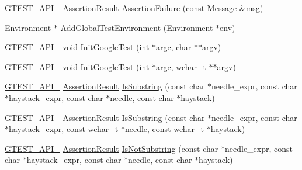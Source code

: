 \begin{DoxyCompactItemize}
\item 
\mbox{\hyperlink{gtest-port_8h_aa73be6f0ba4a7456180a94904ce17790}{G\+T\+E\+S\+T\+\_\+\+A\+P\+I\+\_\+}} \mbox{\hyperlink{classtesting_1_1_assertion_result}{Assertion\+Result}} \mbox{\hyperlink{namespacetesting_aed37b5c1db949665e4022cb4740d86c2}{Assertion\+Failure}} (const \mbox{\hyperlink{classtesting_1_1_message}{Message}} \&msg)
\item 
\mbox{\hyperlink{classtesting_1_1_environment}{Environment}} $\ast$ \mbox{\hyperlink{namespacetesting_a460d7b998622e332392c1e00be3a60d5}{Add\+Global\+Test\+Environment}} (\mbox{\hyperlink{classtesting_1_1_environment}{Environment}} $\ast$env)
\item 
\mbox{\hyperlink{gtest-port_8h_aa73be6f0ba4a7456180a94904ce17790}{G\+T\+E\+S\+T\+\_\+\+A\+P\+I\+\_\+}} void \mbox{\hyperlink{namespacetesting_aee3f6f99df893f576f705f66c0559482}{Init\+Google\+Test}} (int $\ast$argc, char $\ast$$\ast$argv)
\item 
\mbox{\hyperlink{gtest-port_8h_aa73be6f0ba4a7456180a94904ce17790}{G\+T\+E\+S\+T\+\_\+\+A\+P\+I\+\_\+}} void \mbox{\hyperlink{namespacetesting_a6e9d83553f1d10818d698d45689d8adb}{Init\+Google\+Test}} (int $\ast$argc, wchar\+\_\+t $\ast$$\ast$argv)
\item 
\mbox{\hyperlink{gtest-port_8h_aa73be6f0ba4a7456180a94904ce17790}{G\+T\+E\+S\+T\+\_\+\+A\+P\+I\+\_\+}} \mbox{\hyperlink{classtesting_1_1_assertion_result}{Assertion\+Result}} \mbox{\hyperlink{namespacetesting_a5c90a86562b2470213c07742e0eeb0fe}{Is\+Substring}} (const char $\ast$needle\+\_\+expr, const char $\ast$haystack\+\_\+expr, const char $\ast$needle, const char $\ast$haystack)
\item 
\mbox{\hyperlink{gtest-port_8h_aa73be6f0ba4a7456180a94904ce17790}{G\+T\+E\+S\+T\+\_\+\+A\+P\+I\+\_\+}} \mbox{\hyperlink{classtesting_1_1_assertion_result}{Assertion\+Result}} \mbox{\hyperlink{namespacetesting_a08ce65847491b27a38cbac3ac15e3035}{Is\+Substring}} (const char $\ast$needle\+\_\+expr, const char $\ast$haystack\+\_\+expr, const wchar\+\_\+t $\ast$needle, const wchar\+\_\+t $\ast$haystack)
\item 
\mbox{\hyperlink{gtest-port_8h_aa73be6f0ba4a7456180a94904ce17790}{G\+T\+E\+S\+T\+\_\+\+A\+P\+I\+\_\+}} \mbox{\hyperlink{classtesting_1_1_assertion_result}{Assertion\+Result}} \mbox{\hyperlink{namespacetesting_ab553b649b06ef2339cbd90f8dfa119f0}{Is\+Not\+Substring}} (const char $\ast$needle\+\_\+expr, const char $\ast$haystack\+\_\+expr, const char $\ast$needle, const char $\ast$haystack)
\item 

\end{DoxyCompactItemize}
